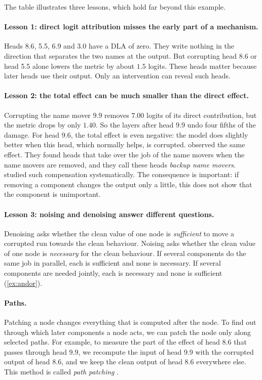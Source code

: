 The table illustrates three lessons, which hold far beyond this example.

\paragraph{Lesson 1: direct logit attribution misses the early part of a mechanism.} Heads 8.6, 5.5, 6.9 and 3.0
have a DLA of zero. They write nothing in the direction that separates the two names at the output. But corrupting
head 8.6 or head 5.5 alone lowers the metric by about $1.5$ logits. These heads matter because later heads use
their output. Only an intervention can reveal such heads.

\paragraph{Lesson 2: the total effect can be much smaller than the direct effect.} Corrupting the name mover 9.9
removes $7.00$ logits of its direct contribution, but the metric drops by only $1.40$. So the layers after head 9.9
undo four fifths of the damage. For head 9.6, the total effect is even negative: the model does slightly better
when this head, which normally helps, is corrupted. \citet{wang2023interpretability} observed the same effect. They
found heads that take over the job of the name movers when the name movers are removed, and they call these heads
\emph{backup name movers}. \citet{mcgrath2023hydra} studied such compensation systematically. The consequence is
important: if removing a component changes the output only a little, this does not show that the component is
unimportant.

\paragraph{Lesson 3: noising and denoising answer different questions.} Denoising asks whether the clean value
of one node is \emph{sufficient} to move a corrupted run towards the clean behaviour. Noising asks whether the
clean value of one node is \emph{necessary} for the clean behaviour. If several components do the same job in
parallel, each is sufficient and none is necessary. If several components are needed jointly, each is necessary
and none is sufficient (\cref{ex:andor}).

\paragraph{Paths.} Patching a node changes everything that is computed after the node. To find out through which
later components a node acts, we can patch the node only along selected paths. For example, to measure the part of
the effect of head 8.6 that passes through head 9.9, we recompute the input of head 9.9 with the corrupted output of
head 8.6, and we keep the clean output of head 8.6 everywhere else. This method is called \emph{path patching} \citep{wang2023interpretability}.

